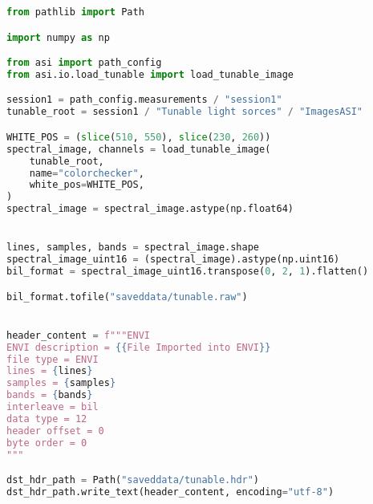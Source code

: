 \begin{lstlisting}[language=python, caption=Save tunable image as ENVI format, label={code:save-tunable}]
from pathlib import Path

import numpy as np

from asi import path_config
from asi.io.load_tunable import load_tunable_image

session1 = path_config.measurements / "session1"
tunable_root = session1 / "Tunable light sorces" / "ImagesASI"

WHITE_POS = (slice(510, 550), slice(230, 260))
spectral_image, channels = load_tunable_image(
    tunable_root,
    name="colorchecker",
    white_pos=WHITE_POS,
)
spectral_image = spectral_image.astype(np.float64)


lines, samples, bands = spectral_image.shape
spectral_image_uint16 = (spectral_image).astype(np.uint16)
bil_format = spectral_image_uint16.transpose(0, 2, 1).flatten()

bil_format.tofile("saveddata/tunable.raw")


header_content = f"""ENVI
ENVI description = {{File Imported into ENVI}}
file type = ENVI
lines = {lines}
samples = {samples}
bands = {bands}
interleave = bil
data type = 12
header offset = 0
byte order = 0
"""

dst_hdr_path = Path("saveddata/tunable.hdr")
dst_hdr_path.write_text(header_content, encoding="utf-8")
\end{lstlisting}